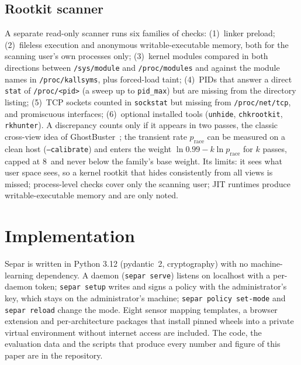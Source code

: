 \documentclass[10pt,twocolumn,letterpaper]{article}
\newcommand{\nats}{\,\text{nats}}
\begin{document}
\subsection{Rootkit scanner}
A separate read-only scanner runs six families of checks: (1)~linker preload; (2)~fileless
execution and anonymous writable-executable memory, both for the scanning user's own processes
only; (3)~kernel modules compared in both directions between \texttt{/sys/module} and
\texttt{/proc/modules} and against the module names in \texttt{/proc/kallsyms}, plus forced-load
taint; (4)~PIDs that answer a direct \texttt{stat} of \texttt{/proc/<pid>} (a sweep up to
\texttt{pid\_max}) but are missing from the directory listing; (5)~TCP sockets counted in
\texttt{sockstat} but missing from \texttt{/proc/net/tcp}, and promiscuous interfaces; (6)~optional
installed tools (\texttt{unhide}, \texttt{chkrootkit}, \texttt{rkhunter}). A discrepancy counts only if it appears in two passes, the classic cross-view idea of
GhostBuster~\cite{wang2005strider}; the transient rate $p_{\text{race}}$ can be measured on a clean
host (\texttt{--calibrate}) and enters the weight $\ln 0.99 - k\ln p_{\text{race}}$ for $k$
passes, capped at 8\nats{} and never below the family's base weight. Its limits: it sees what user space sees, so a kernel rootkit that hides consistently from
all views is missed; process-level checks cover only the scanning user; JIT runtimes produce
writable-executable memory and are only noted.

\section{Implementation}
\label{sec:impl}
Separ is written in Python 3.12 (pydantic~2, cryptography) with no machine-learning dependency.
A daemon (\texttt{separ serve}) listens on localhost with a per-daemon token; \texttt{separ setup}
writes and signs a policy with the administrator's key, which stays on the administrator's machine;
\texttt{separ policy set-mode} and \texttt{separ reload} change the mode. Eight sensor mapping
templates, a browser extension and per-architecture packages that install pinned wheels into a
private virtual environment without internet access are included. The code, the evaluation data and
the scripts that produce every number and figure of this paper are in the repository.

\end{document}
